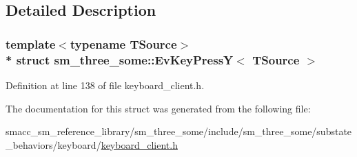 \subsection{Detailed Description}
\subsubsection*{template$<$typename T\+Source$>$\\*
struct sm\+\_\+three\+\_\+some\+::\+Ev\+Key\+Press\+Y$<$ T\+Source $>$}



Definition at line 138 of file keyboard\+\_\+client.\+h.



The documentation for this struct was generated from the following file\+:\begin{DoxyCompactItemize}
\item 
smacc\+\_\+sm\+\_\+reference\+\_\+library/sm\+\_\+three\+\_\+some/include/sm\+\_\+three\+\_\+some/substate\+\_\+behaviors/keyboard/\hyperlink{keyboard__client_8h}{keyboard\+\_\+client.\+h}\end{DoxyCompactItemize}
